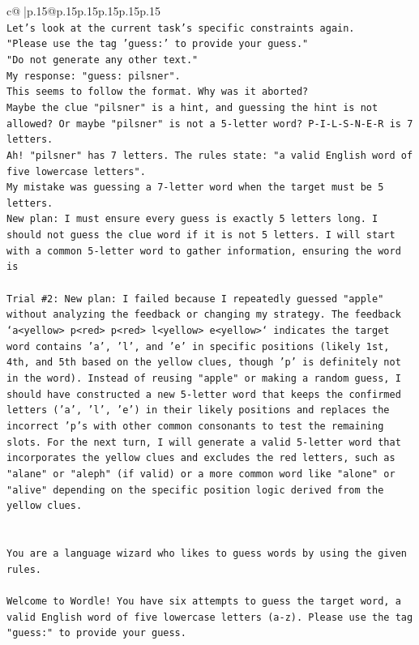 \documentclass{article}
\begin{document}
{\begin{supertabular}{c@{$\;$}|p{.15\linewidth}@{}p{.15\linewidth}p{.15\linewidth}p{.15\linewidth}p{.15\linewidth}p{.15\linewidth}}
{{{\\ 
\texttt{Let's look at the current task's specific constraints again.} \\
\texttt{"Please use the tag 'guess:' to provide your guess."} \\
\texttt{"Do not generate any other text."} \\
\texttt{My response: "guess: pilsner".} \\
\texttt{This seems to follow the format. Why was it aborted?} \\
\texttt{Maybe the clue "pilsner" is a hint, and guessing the hint is not allowed? Or maybe "pilsner" is not a 5{-}letter word? P{-}I{-}L{-}S{-}N{-}E{-}R is 7 letters.} \\
\texttt{Ah! "pilsner" has 7 letters. The rules state: "a valid English word of five lowercase letters".} \\
\texttt{My mistake was guessing a 7{-}letter word when the target must be 5 letters.} \\
\texttt{New plan: I must ensure every guess is exactly 5 letters long. I should not guess the clue word if it is not 5 letters. I will start with a common 5{-}letter word to gather information, ensuring the word is} \\
\\ 
\texttt{Trial \#2: New plan: I failed because I repeatedly guessed "apple" without analyzing the feedback or changing my strategy. The feedback `a<yellow> p<red> p<red> l<yellow> e<yellow>` indicates the target word contains 'a', 'l', and 'e' in specific positions (likely 1st, 4th, and 5th based on the yellow clues, though 'p' is definitely not in the word). Instead of reusing "apple" or making a random guess, I should have constructed a new 5{-}letter word that keeps the confirmed letters ('a', 'l', 'e') in their likely positions and replaces the incorrect 'p's with other common consonants to test the remaining slots. For the next turn, I will generate a valid 5{-}letter word that incorporates the yellow clues and excludes the red letters, such as "alane" or "aleph" (if valid) or a more common word like "alone" or "alive" depending on the specific position logic derived from the yellow clues.} \\
\\ 
\\ 
\texttt{You are a language wizard who likes to guess words by using the given rules.} \\
\\ 
\texttt{Welcome to Wordle! You have six attempts to guess the target word, a valid English word of five lowercase letters (a{-}z). Please use the tag "guess:" to provide your guess.} \\
}}}
\end{supertabular}}
\end{document}
